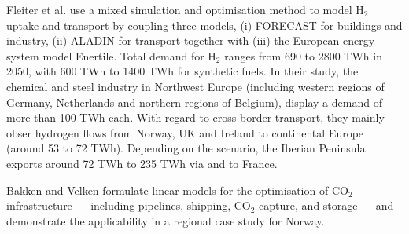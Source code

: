 \documentclass[pdflatex,sn-nature]{sn-jnl}%
\theoremstyle{thmstyleone}%
\theoremstyle{thmstyletwo}%
\theoremstyle{thmstylethree}%
\begin{document}
Fleiter et al. \cite{fleiterHydrogenInfrastructureFuture2025} use a mixed simulation and optimisation method to model H$_2$ uptake and transport by coupling three models, (i) FORECAST for buildings and industry, (ii) ALADIN for transport together with (iii) the European energy system model Enertile. Total demand for H$_2$ ranges from 690 to 2800 TWh in 2050, with 600 TWh to 1400 TWh for synthetic fuels. In their study, the  chemical and steel industry in Northwest Europe (including western regions of Germany, Netherlands and northern regions of Belgium), display a demand of more than 100 TWh each. With regard to cross-border transport, they mainly obser hydrogen flows from Norway, UK and Ireland to continental Europe (around 53 to 72 TWh). Depending on the scenario, the Iberian Peninsula exports around 72 TWh to 235 TWh via and to France.

Bakken and Velken \cite{bakkenLinearModelsOptimization2008} formulate linear models for the optimisation of CO$_2$ infrastructure --- including pipelines, shipping, CO$_2$ capture, and storage --- and demonstrate the applicability in a regional case study for Norway. \cite{birgeValueStochasticSolution1982,birgeIntroductionStochasticProgramming2011,fodstadStochasticModelingNatural2016,vanderweijdeEconomicsPlanningElectricity2012,mobiusRegretAnalysisInvestment2020}
\end{document}
